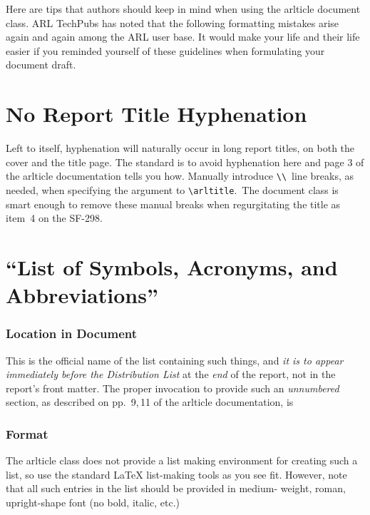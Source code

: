 \documentclass{arlticle}
\def\arlticle{\textsf{\small arlticle}}
\begin{document}
Here are tips that authors should keep in mind when using the \arlticle{}
  document class.
ARL TechPubs has noted that the following formatting mistakes arise again and
  again among the ARL user base.
It would make your life and their life easier if you reminded yourself of these
  guidelines when formulating your document draft.

\section{No Report Title Hyphenation}
Left to itself, hyphenation will naturally occur in long report titles, on both the 
  cover and the title page.
The standard is to avoid hyphenation here and page 3 of the \arlticle {} documentation
  tells you how.
Manually introduce \verb|\\|\, line breaks, as needed, when specifying the
  argument to \verb|\arltitle|.\,
The document class is smart enough to remove these manual breaks when regurgitating 
  the title as item~4 on the SF-298.

\section{``List of Symbols, Acronyms, and Abbreviations''}

\subsubsection*{Location in Document}
This is the official name of the list containing such things, and \textit{it is
  to appear immediately before the Distribution List} at the \textit{end} of the
  report, not in the report's front matter.
The proper invocation to provide such an \textit{unnumbered} section, as
  described on pp.~9,\,11 of the \arlticle{} documentation, is 

\begin{verbbox}[\footnotesize]
\end{verbbox}
\theverbbox

\subsubsection*{Format}
The \arlticle{} class does not provide a list making environment for creating
  such a list, so use the standard \LaTeX{} list-making tools as you see fit.
However, note that all such entries in the list should be provided in medium-%
  weight, roman, upright-shape font (no bold, italic, etc.)
\end{document}
